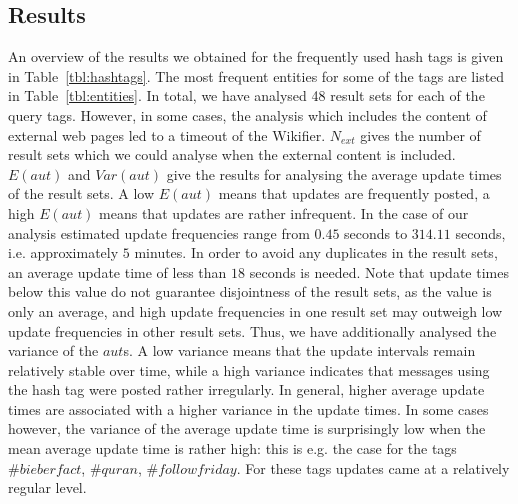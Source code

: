\documentclass{llncs}
\begin{document}
\subsection{Results}

An overview of the results we obtained for the frequently used hash tags is given in Table~\ref{tbl:hashtags}. The most frequent entities for some of the tags are listed in Table~\ref{tbl:entities}. In total, we have analysed 48 result sets for each of the query tags. However, in some cases, the analysis which includes the content of external web pages led to a timeout of the Wikifier. $N_{ext}$ gives the number of result sets which we could analyse when the external content is included. $E(aut)$ and $Var(aut)$ give the results for analysing the average update times of the result sets. A low $E(aut)$ means that updates are frequently posted, a high $E(aut)$ means that updates are rather infrequent. In the case of our analysis estimated update frequencies range from $0.45$ seconds to $314.11$ seconds, i.e. approximately $5$ minutes. In order to avoid any duplicates in the result sets, an average update time of less than $18$ seconds is needed. Note that update times below this value do not guarantee disjointness of the result sets, as the value is only an average, and high update frequencies in one result set may outweigh low update frequencies in other result sets. Thus, we have additionally analysed the variance of the $aut$s. A low variance means that the update intervals remain relatively stable over time, while a high variance indicates that messages using the hash tag were posted rather irregularly. In general, higher average update times are associated with a higher variance in the update times. In some cases however, the variance of the average update time is surprisingly low when the mean average update time is rather high: this is e.g. the case for the tags $\#bieberfact$, $\#quran$, $\#followfriday$. For these tags updates came at a relatively regular level.
\end{document}
